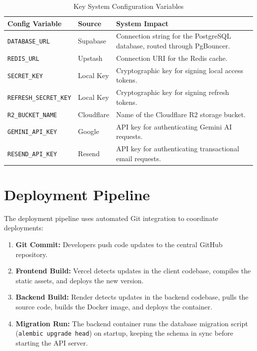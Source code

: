 \begin{table}[h!]
\centering
\small
\renewcommand{\arraystretch}{1.4}
\begin{tabularx}{\textwidth}{l l X}
    \toprule[1.5pt]
    \rowcolor{primary!5}
    \textbf{\color{primary}Config Variable} & \textbf{\color{primary}Source} & \textbf{\color{primary}System Impact} \\
    \midrule
    \texttt{DATABASE\_URL} & Supabase & Connection string for the PostgreSQL database, routed through PgBouncer. \\
    \texttt{REDIS\_URL} & Upstash & Connection URI for the Redis cache. \\
    \texttt{SECRET\_KEY} & Local Key & Cryptographic key for signing local access tokens. \\
    \texttt{REFRESH\_SECRET\_KEY} & Local Key & Cryptographic key for signing refresh tokens. \\
    \texttt{R2\_BUCKET\_NAME} & Cloudflare & Name of the Cloudflare R2 storage bucket. \\
    \texttt{GEMINI\_API\_KEY} & Google & API key for authenticating Gemini AI requests. \\
    \texttt{RESEND\_API\_KEY} & Resend & API key for authenticating transactional email requests. \\
    \bottomrule[1.5pt]
\end{tabularx}
\caption{Key System Configuration Variables}
\label{tab:env_config}
\end{table}

\section{Deployment Pipeline}
The deployment pipeline uses automated Git integration to coordinate deployments:
\begin{enumerate}
    \item \textbf{Git Commit:} Developers push code updates to the central GitHub repository.
    \item \textbf{Frontend Build:} Vercel detects updates in the client codebase, compiles the static assets, and deploys the new version.
    \item \textbf{Backend Build:} Render detects updates in the backend codebase, pulls the source code, builds the Docker image, and deploys the container.
    \item \textbf{Migration Run:} The backend container runs the database migration script (\texttt{alembic upgrade head}) on startup, keeping the schema in sync before starting the API server.
\end{enumerate}

